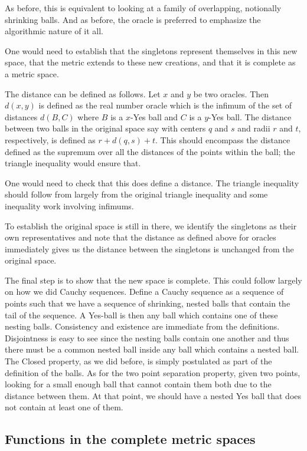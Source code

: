 \documentclass[12pt]{article}
\theoremstyle{remark}
\begin{document}
As before, this is equivalent to looking at a family of overlapping, notionally shrinking balls. And as before, the oracle is preferred to emphasize the algorithmic nature of it all. 

One would need to establish that the singletons represent themselves in this new space, that the metric extends to these new creations, and that it is complete as a metric space. 

The distance can be defined as follows. Let $x$ and $y$ be two oracles. Then $d(x,y)$ is defined as the real number oracle which is the infimum of the set of distances $d(B, C)$ where $B$ is a $x$-Yes ball and $C$ is a $y$-Yes ball. The distance between two balls in the original space say with centers $q$ and $s$ and radii $r$ and $t$, respectively, is defined as $r + d(q,s) + t$. This should encompass the distance defined as the supremum over all the distances of the points within the ball; the triangle inequality would ensure that.  

One would need to check that this does define a distance. The triangle inequality should follow from largely from the original triangle inequality and some inequality work involving infimums. 

To establish the original space is still in there, we identify the singletons as their own representatives and note that the distance as defined above for oracles immediately gives us the distance between the singletons is unchanged from the original space. 

The final step is to show that the new space is complete. This could follow largely on how we did Cauchy sequences. Define a Cauchy sequence as a sequence of points such that we have a sequence of shrinking, nested balls that contain the tail of the sequence. A Yes-ball is then any ball which contains one of these nesting balls. Consistency and existence are immediate from the definitions. Disjointness is easy to see since the nesting balls contain one another and thus there must be a common nested ball inside any ball which contains a nested ball. The Closed property, as we did before, is simply postulated as part of the definition of the balls. As for the two point separation property, given two points, looking for a small enough ball that cannot contain them both due to the distance between them. At that point, we should have a nested Yes ball that does not contain at least one of them. 

\subsection{Functions in the complete metric spaces}
\end{document}

